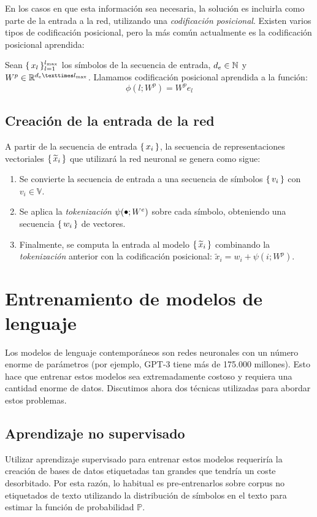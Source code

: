 En los casos en que esta información sea necesaria, la solución es incluirla como parte de la entrada a la red, utilizando una \textit{codificación posicional}. Existen varios tipos de codificación posicional, pero la más común actualmente es la codificación posicional aprendida: 
\begin{definition}
    Sean \( \{\,x_l\,\}_{l = 1}^{l_\text{max}} \) los símbolos de la secuencia de entrada, \( d_e \in \mathbb{N} \) y \( W^p \in \real{d_e × l_\text{max}} \). Llamamos codificación posicional aprendida a la función:
    \[
        \phi(l; W^p) = W^p e_l
    \]
\end{definition}

\subsection{Creación de la entrada de la red}
A partir de la secuencia de entrada \( \{\, x_i \,\} \), la secuencia de representaciones vectoriales \( \{\, \widetilde{x}_i \,\} \) que utilizará la red neuronal se genera como sigue:
\begin{enumerate}
    \item Se convierte la secuencia de entrada a una secuencia de símbolos \( \{\, v_i \,\} \) con \( v_i \in \mathbb{V} \).
    \item Se aplica la \textit{tokenización} \( \psi(\smallbullet; W^e) \) sobre cada símbolo, obteniendo una secuencia \( \{\, w_i \,\} \) de vectores.
    \item Finalmente, se computa la entrada al modelo \( \{\, \widetilde{x}_i \,\} \) combinando la \textit{tokenización} anterior con la codificación posicional: \( \widetilde{x}_i = w_i + \psi(i; W^p) \).
\end{enumerate}

\section{Entrenamiento de modelos de lenguaje}
Los modelos de lenguaje contemporáneos son redes neuronales con un número enorme de parámetros (por ejemplo, GPT-3 tiene más de 175.000 millones). Esto hace que entrenar estos modelos sea extremadamente costoso y requiera una cantidad enorme de datos. Discutimos ahora dos técnicas utilizadas para abordar estos problemas. 

\subsection{Aprendizaje no supervisado}
Utilizar aprendizaje supervisado para entrenar estos modelos requeriría la creación de bases de datos etiquetadas tan grandes que tendría un coste desorbitado. Por esta razón, lo habitual es pre-entrenarlos sobre corpus no etiquetados de texto utilizando la distribución de símbolos en el texto para estimar la función de probabilidad \( \mathbb{P} \). 

